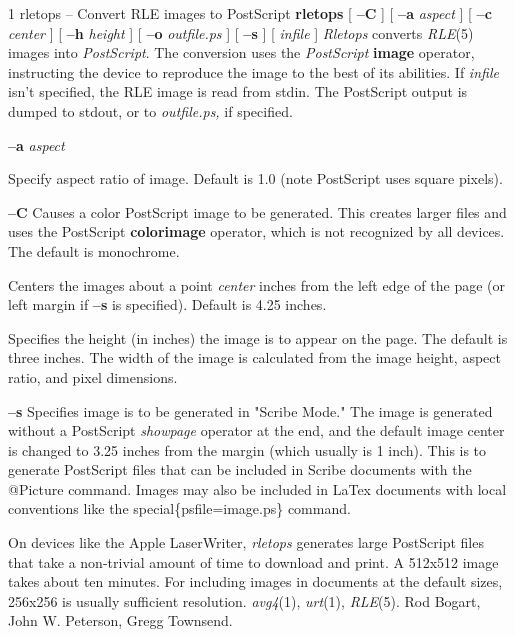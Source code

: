 %
%
%
 1
rletops -- Convert RLE images to PostScript
{\bf rletops}
[
{\bf --C}
] [
{\bf --a}
{\it aspect}
] [
{\bf --c}
{\it center}
] [
{\bf --h}
{\it height}
] [
{\bf --o}
{\it outfile.ps}
] [
{\bf --s}
] [
{\it infile}
]
{\it Rletops}
converts
{\it RLE}{\rm (5)}
images into 
{\it PostScript}{\rm .}
The conversion uses the 
{\it PostScript}
{\bf image}
operator, instructing the device to reproduce the image to the best of its
abilities.  If
{\it infile}
isn't specified, the RLE image is read from stdin.  The PostScript output is
dumped to stdout, or to
{\it outfile.ps,}
if specified.
\begin{TPlist}{{\bf %
\bf --a} %
\it aspect%
\rm }
\item[{{\bf %
\bf --a} %
\it aspect%
\rm }]
Specify aspect ratio of image.  Default is 1.0 (note PostScript uses square
pixels).
\item[{{\bf --C}}]
Causes a color PostScript image to be generated.
This creates larger files and uses the PostScript
{\bf colorimage}
operator, which is not recognized by all devices.
The default is monochrome.
\item[{{\bf %
\bf --c} %
\it center%
\rm }]
Centers the images about a point
{\it center}
inches from the left edge of the page (or left margin if
{\bf --s}
is specified).  Default is 4.25 inches.
\item[{{\bf %
\bf --h} %
\it height%
\rm }]
Specifies the height (in inches) the image is to appear on the page.  The
default is three inches.  The width of the image is calculated from
the image height, aspect ratio, and pixel dimensions.
\item[{{\bf --s}}]
Specifies image is to be generated in "Scribe Mode."  The image is generated
without a PostScript
{\it showpage}
operator at the end, and the default image center is changed to 3.25 inches
from the margin (which usually is 1 inch).
This is to generate PostScript files that can be included in Scribe documents
with the @Picture command.  Images may also be included in LaTex documents
with local conventions like the \bs special\{psfile=image.ps\} command.  
\end{TPlist}
On devices like the Apple LaserWriter, 
{\it rletops}
generates large PostScript files that take a non-trivial amount of time
to download and print.  A 512x512 image takes about ten minutes.
For including images in documents at the default sizes, 256x256 is
usually sufficient resolution.
{\it avg4}{\rm (1),}
{\it urt}{\rm (1),}
{\it RLE}{\rm (5).}
Rod Bogart, John W. Peterson, Gregg Townsend.

